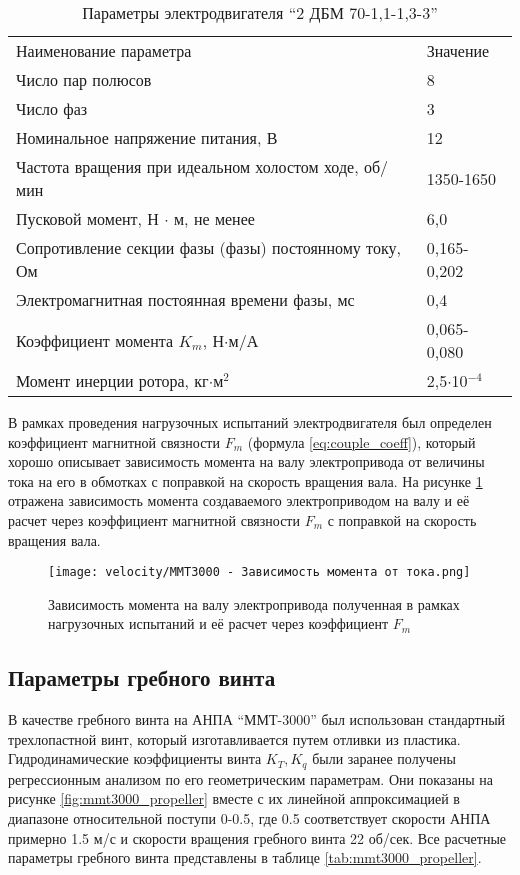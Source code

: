 \begin{table}
    \caption{Параметры электродвигателя ``2 ДБМ 70-1,1-1,3-3'' }\label{tab:mmt300_motor}
    \centering
    \begin{tabular}{ll}
        Наименование параметра  & Значение\\
        Число пар полюсов & 8 \\
        Число фаз & 3 \\
        Номинальное напряжение питания, В   & 12 \\
        Частота вращения при идеальном холостом ходе, об/мин & 1350-1650 \\
        Пусковой момент, Н $\cdot$ м, не менее      & 6,0 \\
        Сопротивление секции фазы (фазы) постоянному току, Ом & 0,165-0,202 \\
        Электромагнитная постоянная времени фазы, мс & 0,4 \\
        Коэффициент момента $K_m$, Н$\cdot$м/А   & 0,065-0,080   \\
        Момент инерции ротора, кг$\cdot$м$^2$   & 2,5$\cdot$10$^{-4}$ \\
    \end{tabular}
\end{table}

В рамках проведения нагрузочных испытаний электродвигателя был определен коэффициент магнитной связности $F_m$ (формула \ref{eq:couple_coeff}), который хорошо описывает зависимость момента на валу электропривода от величины тока на его в обмотках с поправкой на скорость вращения вала.
На рисунке \ref{fig:motor_torque} отражена зависимость момента создаваемого электроприводом на валу и её расчет через коэффициент магнитной связности $F_m$ с поправкой на скорость вращения вала.

\begin{figure}[ht]
    \centering
    \texttt{[image: velocity/MMT3000 - Зависимость момента от тока.png]}
    \caption{Зависимость момента на валу электропривода полученная в рамках нагрузочных испытаний и её расчет через коэффициент $F_m$}
    \label{fig:motor_torque}
\end{figure}

\subsection{Параметры гребного винта}
В качестве гребного винта на АНПА ``ММТ-3000'' был использован стандартный трехлопастной винт, который изготавливается путем отливки из пластика.
Гидродинамические коэффициенты винта $K_T, K_q$ были заранее получены регрессионным анализом по его геометрическим параметрам.
Они показаны на рисунке \ref{fig:mmt3000_propeller} вместе с их линейной аппроксимацией в диапазоне относительной поступи 0-0.5, где 0.5 соответствует скорости АНПА примерно 1.5 м/с и скорости вращения гребного винта 22 об/сек.
Все расчетные параметры гребного винта представлены в таблице \ref{tab:mmt3000_propeller}.

